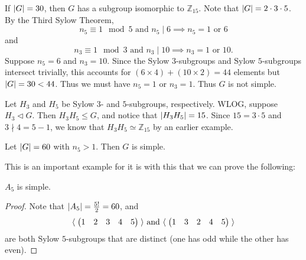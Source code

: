 \documentclass[notoc,notitlepage,nobib]{tufte-book}
\begin{document}
\begin{eg}
  If $\left| G \right| = 30$, then $G$ has a subgroup isomorphic to $\mathbb{Z}_{15}$.
  Note that $\left| G \right| = 2 \cdot 3 \cdot 5$. By the Third Sylow Theorem,
  \begin{equation*}
    n_5 \equiv 1 \mod 5 \text{ and } n_5 \mid 6 \implies n_5 = 1 \text{ or } 6
  \end{equation*}
  and
  \begin{equation*}
    n_3 \equiv 1 \mod 3 \text{ and } n_3 \mid 10 \implies n_3 = 1 \text{ or } 10.
  \end{equation*}
  Suppose $n_5 = 6$ and $n_3 = 10$. Since the Sylow $3$-subgroups and Sylow 
  $5$-subgroups intersect trivially, this accounts for 
  $(6 \times 4) + ( 10 \times 2 ) = 44$ elements but $\left|G\right| = 30 < 44$.
  Thus we must have $n_5 = 1$ or $n_3 = 1$. Thus $G$ is not simple.

  Let $H_3$ and $H_5$ be Sylow $3$- and $5$-subgroups, respectively. WLOG, suppose
  $H_3 \triangleleft G$. Then $H_3 H_5 \leq G$, and notice that $\left|H_3 H_5\right| = 15$.
  Since $15 = 3 \cdot 5$ and $3 \nmid 4 = 5 - 1$, we know that $H_3 H_5 \simeq \mathbb{Z}_{15}$
  by an earlier example.
\end{eg}

\begin{eg}\label{eg:g_60_is_simple}
  Let $\left| G \right| = 60$ with $n_5 > 1$. Then $G$ is simple.
\end{eg}

This is an important example for it is with this that we can prove the following:

\begin{crly}[$A_5$ is Simple]\label{crly:_a_5_is_simple}
  $A_5$ is simple.
\end{crly}

\begin{proof}
  Note that $\left| A_5 \right| = \frac{5!}{2} = 60$, and
  \begin{equation*}
    \langle \; \begin{pmatrix} 1 & 2 & 3 & 4 & 5 \end{pmatrix} \; \rangle 
    \text{ and } \langle \; \begin{pmatrix} 1 & 3 & 2 & 4 & 5 \end{pmatrix} \; \rangle
  \end{equation*}
  are both Sylow $5$-subgroups that are distinct (one has odd  while the
  other has even).
\end{proof}
\end{document}

